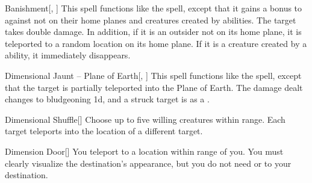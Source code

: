 \lowercase{\hypertarget{spell:Banishment}{}}\label{spell:Banishment}
\begin{freeability}[\nth{2}]{\hypertarget{spell:Banishment}{Banishment}}[, ]
This spell functions like the  spell, except that it gains a  bonus to  against  not on their home planes and creatures created by  abilities.
\crit The target takes double damage.
In addition, if it is an outsider not on its home plane, it is teleported to a random location on its home plane.
If it is a creature created by a  ability, it immediately disappears.
\end{freeability}
\vspace{0.25em}



\lowercase{\hypertarget{spell:Dimensional Jaunt -- Plane of Earth}{}}\label{spell:Dimensional Jaunt -- Plane of Earth}
\begin{freeability}[\nth{2}]{\hypertarget{spell:Dimensional Jaunt -- Plane of Earth}{Dimensional Jaunt -- Plane of Earth}}[, ]
This spell functions like the  spell, except that the target is partially teleported into the Plane of Earth.
The damage dealt changes to bludgeoning  \minus1d, and a struck target is  as a .
\end{freeability}
\vspace{0.25em}



\lowercase{\hypertarget{spell:Dimensional Shuffle}{}}\label{spell:Dimensional Shuffle}
\begin{freeability}[\nth{2}]{\hypertarget{spell:Dimensional Shuffle}{Dimensional Shuffle}}[]
Choose up to five willing creatures within \rngmed range.
Each target teleports into the location of a different target.
\end{freeability}
\vspace{0.25em}



\lowercase{\hypertarget{spell:Dimension Door}{}}\label{spell:Dimension Door}
\begin{freeability}[\nth{3}]{\hypertarget{spell:Dimension Door}{Dimension Door}}[]
You teleport to a location within \rngext range of you.
You must clearly visualize the destination's appearance, but you do not need  or  to your destination.
\end{freeability}
\vspace{0.25em}



